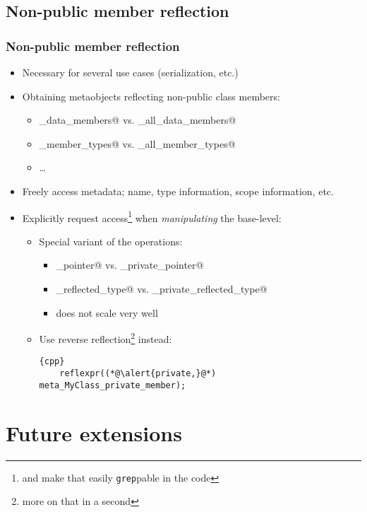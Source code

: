 \documentclass[compress,table,xcolor=table]{beamer}
\begin{document}
\subsection{Non-public member reflection}
\begin{frame}[fragile]
\frametitle{Non-public member reflection}
  \small
  \begin{itemize}
    \item Necessary for several use cases (serialization, etc.)
    \item Obtaining metaobjects reflecting non-public class members:
    \begin{itemize}
      \footnotesize
      \item \verb@get_data_members@ vs. \verb@get_all_data_members@
      \item \verb@get_member_types@ vs. \verb@get_all_member_types@
      \item \ldots
    \end{itemize}
    \item Freely access metadata; name, type information, scope information, etc.
    \item Explicitly request access\footnote{and make that easily
      \texttt{grep}pable in the code} when {\em manipulating} the base-level:
    \begin{itemize}
      \footnotesize
        \item Special variant of the operations:
        \begin{itemize}
          \scriptsize
          \item \verb@get_pointer@ vs. \verb@get_private_pointer@
          \item \verb@get_reflected_type@ vs. \verb@get_private_reflected_type@
          \item does not scale very well
        \end{itemize}
        \item Use reverse reflection\footnote{more on that in a second} instead:
        \begin{lstlisting}{cpp}
	reflexpr((*@\alert{private,}@*) meta_MyClass_private_member);
        \end{lstlisting}
    \end{itemize}
  \end{itemize}
\end{frame}

\section{Future extensions}
\end{document}
